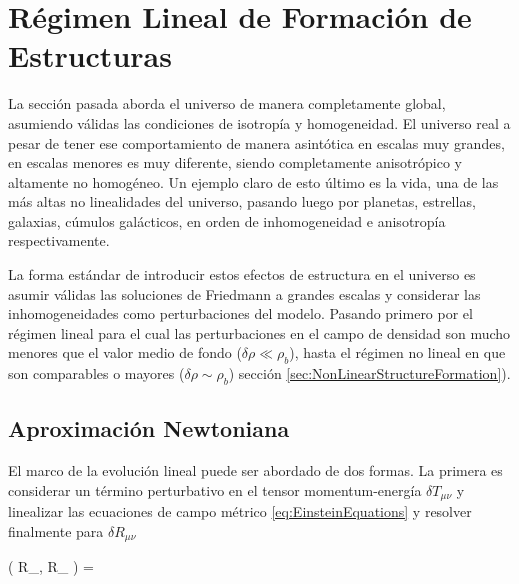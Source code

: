 



\section{Régimen Lineal de Formación de Estructuras}
\label{sec:LinearStructureFormation}


La sección pasada aborda el universo de manera completamente global, 
asumiendo válidas las condiciones de isotropía y homogeneidad. El 
universo real a pesar de tener ese comportamiento de manera asintótica en
escalas muy grandes, en escalas menores es muy diferente, siendo 
completamente anisotrópico y altamente no homogéneo. Un ejemplo claro de 
esto último es la vida, una de las más altas no linealidades del universo,
pasando luego por planetas, estrellas, galaxias, cúmulos galácticos, en 
orden de inhomogeneidad e anisotropía respectivamente.


La forma estándar de introducir estos efectos de estructura en el universo
es asumir válidas las soluciones de Friedmann a grandes escalas y considerar
las inhomogeneidades como perturbaciones del modelo. Pasando primero por el
régimen lineal para el cual las perturbaciones en el campo de densidad son 
mucho menores que el valor medio de fondo ($\delta \rho \ll \rho_b$), hasta 
el régimen no lineal en que son comparables o mayores 
($\delta \rho \sim \rho_b$) sección \ref{sec:NonLinearStructureFormation}).


	\subsection{Aproximación Newtoniana}
	\label{subsec:Newtonian Approximation}


El marco de la evolución lineal puede ser abordado de dos formas. La primera
es considerar un término perturbativo en el tensor momentum-energía 
$ \delta T_{\mu \nu}$ y linealizar las ecuaciones de campo métrico 
\ref{eq:EinsteinEquations} y resolver finalmente para $\delta R_{\mu \nu}$


{ ( R_{\mu \nu}, \delta R_{\mu \nu} ) = 
 }


